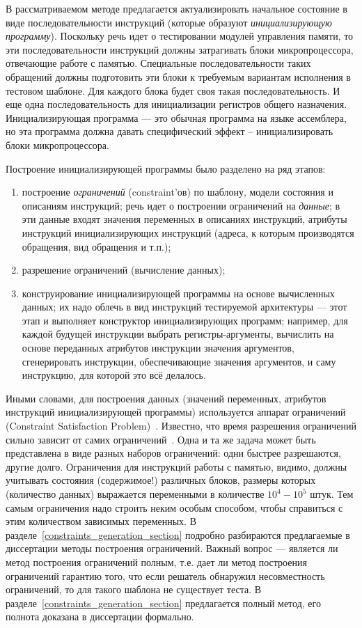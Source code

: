\documentclass[14pt]{extreport}
\begin{document}
В рассматриваемом методе предлагается актуализировать начальное состояние в виде последовательности инструкций (которые образуют \emph{инициализирующую программу}). Поскольку речь идет о тестировании модулей управления памяти, то эти последовательности инструкций должны затрагивать блоки микропроцессора, отвечающие работе с памятью. Специальные последовательности таких обращений должны подготовить эти блоки к требуемым вариантам исполнения в тестовом шаблоне. Для каждого блока будет своя такая последовательность. И еще одна последовательность для инициализации регистров общего назначения. Инициализирующая программа --- это обычная программа на языке ассемблера, но эта программа должна давать специфический эффект -- инициализировать блоки микропроцессора.

Построение инициализирующей программы было разделено на ряд этапов:
\begin{enumerate}
  \item построение \emph{ограничений} (constraint'ов) по шаблону, модели состояния и описаниям инструкций; речь идет о построении ограничений на \emph{данные}; в эти данные входят значения переменных в описаниях инструкций, атрибуты инструкций инициализирующих инструкций (адреса, к которым производятся обращения, вид обращения и т.п.);
  \item разрешение ограничений (вычисление данных);
  \item конструирование инициализирующей программы на основе вычисленных данных; их надо облечь в вид инструкций тестируемой архитектуры --- этот этап и выполняет конструктор инициализирующих программ; например, для каждой будущей инструкции выбрать регистры-аргументы, вычислить на основе переданных атрибутов инструкции значения аргументов, сгенерировать инструкции, обеспечивающие значения аргументов, и саму инструкцию, для которой это всё делалось.
\end{enumerate}

Иными словами, для построения данных (значений переменных, атрибутов инструкций инициализирующей программы) используется аппарат ограничений (Constraint Satisfaction Problem)~\cite{CSP}. Известно, что время разрешения ограничений сильно зависит от самих ограничений~\cite{isaac05balanced}. Одна и та же задача может быть представлена в виде разных наборов ограничений: одни быстрее разрешаются, другие долго. Ограничения для инструкций работы с памятью, видимо, должны учитывать состояния (содержимое!) различных блоков, размеры которых (количество данных) выражается переменными в количестве $10^4-10^5$ штук. Тем самым ограничения надо строить неким особым способом, чтобы справиться с этим количеством зависимых переменных. В разделе~\ref{constraints_generation_section} подробно разбираются предлагаемые в диссертации методы построения ограничений. Важный вопрос --- является ли метод построения ограничений полным, т.е. дает ли метод построения ограничений гарантию того, что если решатель обнаружил несовместность ограничений, то для такого шаблона не существует теста. В разделе~\ref{constraints_generation_section} предлагается полный метод, его полнота доказана в диссертации формально.
\end{document}
